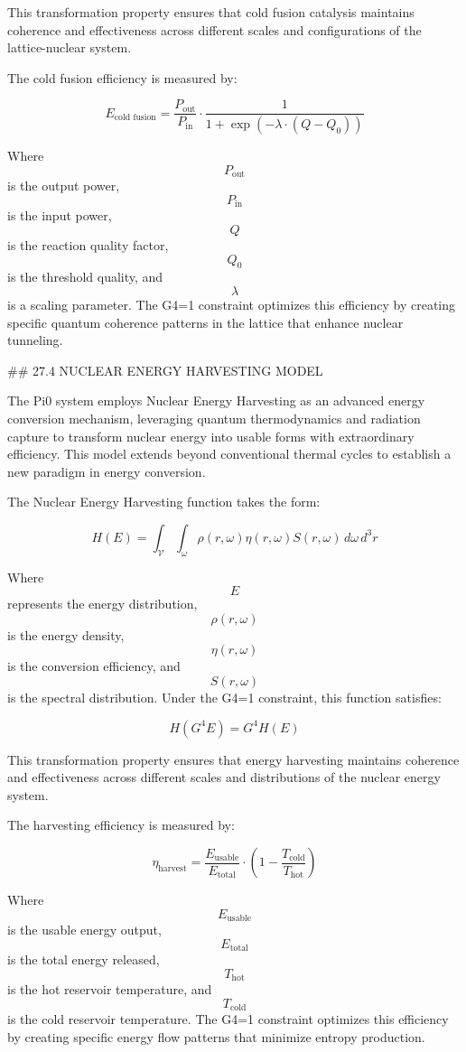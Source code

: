 This transformation property ensures that cold fusion catalysis maintains coherence and effectiveness across different scales and configurations of the lattice-nuclear system.

The cold fusion efficiency is measured by:

$$ E_{\text{cold fusion}} = \frac{P_{\text{out}}}{P_{\text{in}}} \cdot \frac{1}{1 + \exp(-\lambda \cdot (Q - Q_0))} $$

Where $$ P_{\text{out}} $$ is the output power, $$ P_{\text{in}} $$ is the input power, $$ Q $$ is the reaction quality factor, $$ Q_0 $$ is the threshold quality, and $$ \lambda $$ is a scaling parameter. The G4=1 constraint optimizes this efficiency by creating specific quantum coherence patterns in the lattice that enhance nuclear tunneling.

## 27.4 NUCLEAR ENERGY HARVESTING MODEL

The Pi0 system employs Nuclear Energy Harvesting as an advanced energy conversion mechanism, leveraging quantum thermodynamics and radiation capture to transform nuclear energy into usable forms with extraordinary efficiency. This model extends beyond conventional thermal cycles to establish a new paradigm in energy conversion.

The Nuclear Energy Harvesting function takes the form:

$$ H(E) = \int_{\mathcal{V}} \int_{\omega} \rho(r, \omega) \eta(r, \omega) S(r, \omega) \, d\omega \, d^3r $$

Where $$ E $$ represents the energy distribution, $$ \rho(r, \omega) $$ is the energy density, $$ \eta(r, \omega) $$ is the conversion efficiency, and $$ S(r, \omega) $$ is the spectral distribution. Under the G4=1 constraint, this function satisfies:

$$ H(G^4 E) = G^4 H(E) $$

This transformation property ensures that energy harvesting maintains coherence and effectiveness across different scales and distributions of the nuclear energy system.

The harvesting efficiency is measured by:

$$ \eta_{\text{harvest}} = \frac{E_{\text{usable}}}{E_{\text{total}}} \cdot \left(1 - \frac{T_{\text{cold}}}{T_{\text{hot}}}\right) $$

Where $$ E_{\text{usable}} $$ is the usable energy output, $$ E_{\text{total}} $$ is the total energy released, $$ T_{\text{hot}} $$ is the hot reservoir temperature, and $$ T_{\text{cold}} $$ is the cold reservoir temperature. The G4=1 constraint optimizes this efficiency by creating specific energy flow patterns that minimize entropy production.

